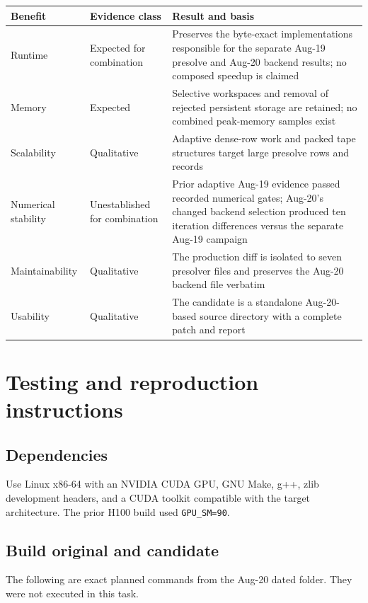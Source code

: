 \documentclass[10pt,a4paper]{article}
\begin{document}
\begin{tabularx}{\textwidth}{@{}P{0.20\textwidth}P{0.18\textwidth}Y@{}}
\toprule
\textbf{Benefit} & \textbf{Evidence class} & \textbf{Result and basis}\\
\midrule
Runtime & Expected for combination & Preserves the byte-exact implementations responsible for the separate Aug-19 presolve and Aug-20 backend results; no composed speedup is claimed\\
Memory & Expected & Selective workspaces and removal of rejected persistent storage are retained; no combined peak-memory samples exist\\
Scalability & Qualitative & Adaptive dense-row work and packed tape structures target large presolve rows and records\\
Numerical stability & Unestablished for combination & Prior adaptive Aug-19 evidence passed recorded numerical gates; Aug-20's changed backend selection produced ten iteration differences versus the separate Aug-19 campaign\\
Maintainability & Qualitative & The production diff is isolated to seven presolver files and preserves the Aug-20 backend file verbatim\\
Usability & Qualitative & The candidate is a standalone Aug-20-based source directory with a complete patch and report\\
\bottomrule
\end{tabularx}

\section{Testing and reproduction instructions}
\label{sec:reproduction}

\subsection{Dependencies}

Use Linux x86-64 with an NVIDIA CUDA GPU, GNU Make, g++, zlib development
headers, and a CUDA toolkit compatible with the target architecture.  The
prior H100 build used \texttt{GPU\_SM=90}.

\subsection{Build original and candidate}

The following are exact planned commands from the Aug-20 dated folder.  They
were not executed in this task.
\end{document}
